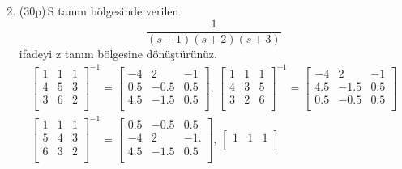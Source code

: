 \begin{enumerate}[\bfseries S1.]
\begin{equation*}
    \end{equation*}
    \item (30p)\,S tanım bölgesinde verilen 
    \begin{equation}
        \frac{1}{(s+1)(s+2)(s+3)}
    \end{equation}
    ifadeyi z tanım bölgesine dönüştürünüz. 
    \begin{equation*}
    \begin{split}
        \begin{bmatrix}
            1&     1&     1\\
            4&     5&     3\\
            3&     6&     2\\
        \end{bmatrix}^{-1}=\begin{bmatrix}
            -4 &   2   &    -1\\
            0.5&   -0.5&    0.5\\
            4.5&   -1.5&    0.5\\
        \end{bmatrix},\,
        \begin{bmatrix}
            1&     1&     1\\
            4&     3&     5\\
            3&     2&     6\\
        \end{bmatrix}^{-1}=\begin{bmatrix}
            -4&    2&   -1\\
            4.5&   -1.5&    0.5\\
            0.5&  -0.5&    0.5\\
        \end{bmatrix}\\
        \begin{bmatrix}
            1&     1&     1\\
            5&     4&     3\\
            6&     3&     2\\
        \end{bmatrix}^{-1}=\begin{bmatrix}
        0.5 &  -0.5 &   0.5\\
        -4&    2&   -1.\\
        4.5 &  -1.5 &   0.5\\
        \end{bmatrix},\,
        \begin{bmatrix}
            1&     1&     1\\

\end{bmatrix}
\end{split}
\end{equation*}
\end{enumerate}
